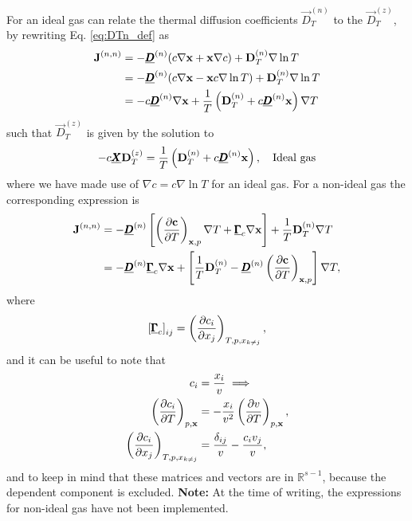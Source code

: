 For an ideal gas can relate the thermal diffusion coefficients $\Vec{D}_T^{(n)}$ to the $\Vec{D}_T^{(z)}$, by rewriting Eq. \eqref{eq:DTn_def} as 
\begin{equation}
    \begin{split}
        \boldsymbol{\mathrm{J}}^{(n, n)} &= - \underline{\pmb{D}}^{(n)} ( c \nabla \boldsymbol{\mathrm{x}} + \boldsymbol{\mathrm{x}} \nabla c) + \boldsymbol{\mathrm{D}}_T^{(n)} \nabla \ln T \\
        &= - \underline{\pmb{D}}^{(n)} ( c \nabla \boldsymbol{\mathrm{x}} - \boldsymbol{\mathrm{x}} c \nabla \ln T) + \boldsymbol{\mathrm{D}}_T^{(n)} \nabla \ln T \\
        &= - c \underline{\pmb{D}}^{(n)} \nabla \boldsymbol{\mathrm{x}} + \frac{1}{T} \left( \boldsymbol{\mathrm{D}}_T^{(n)} + c \underline{\pmb{D}}^{(n)}\boldsymbol{\mathrm{x}}\right) \nabla T
    \end{split}
\end{equation}
such that $\Vec{D}_T^{(z)}$ is given by the solution to
\begin{equation}
    - c \underline{\pmb{X}} \boldsymbol{\mathrm{D}}_T^{(z)} = \frac{1}{T} \left( \boldsymbol{\mathrm{D}}_T^{(n)} + c \underline{\pmb{D}}^{(n)}\boldsymbol{\mathrm{x}}\right), \quad \text{Ideal gas}
    \label{eq:DTz_DTn_relate}
\end{equation}
where we have made use of $\nabla c = c \nabla \ln T$ for an ideal gas. For a non-ideal gas the corresponding expression is
\begin{equation}
    \begin{split}
        \boldsymbol{\mathrm{J}}^{(n, n)} &= - \underline{\pmb{D}}^{(n)} \left[\left(\frac{\partial \boldsymbol{\mathrm{c}}}{\partial T}\right)_{\boldsymbol{\mathrm{x}}, p} \nabla T + \underline{\pmb{\Gamma}}_c \nabla \boldsymbol{\mathrm{x}}\right] + \frac{1}{T}\boldsymbol{\mathrm{D}}_T^{(n)} \nabla T \\
        &= - \underline{\pmb{D}}^{(n)} \underline{\pmb{\Gamma}}_c \nabla \boldsymbol{\mathrm{x}} + \left[\frac{1}{T}\boldsymbol{\mathrm{D}}_T^{(n)} - \underline{\pmb{D}}^{(n)} \left(\frac{\partial \boldsymbol{\mathrm{c}}}{\partial T}\right)_{\boldsymbol{\mathrm{x}}, p}\right] \nabla T,
    \end{split}
\end{equation}
where 
\begin{equation}
    \left[\underline{\pmb{\Gamma}}_c\right]_{ij} = \left(\frac{\partial c_i}{\partial x_j}\right)_{T, p, x_{k \neq j}},
\end{equation}
and it can be useful to note that 
\begin{equation}
    \begin{split}
        c_i &= \frac{x_i}{v} \implies \\
        \left(\frac{\partial c_i}{\partial T}\right)_{p, \boldsymbol{\mathrm{x}}} &= - \frac{x_i}{v^2} \left(\frac{\partial v}{\partial T}\right)_{p, \boldsymbol{\mathrm{x}}}, \\
        \left(\frac{\partial c_i}{\partial x_j}\right)_{T, p, x_{k \neq j}} &= \frac{\delta_{ij}}{v} - \frac{c_i v_j}{v},
    \end{split}
\end{equation}
and to keep in mind that these matrices and vectors are in $\mathbb{R}^{s - 1}$, because the dependent component is excluded. \textbf{Note:} At the time of writing, the expressions for non-ideal gas have not been implemented.

